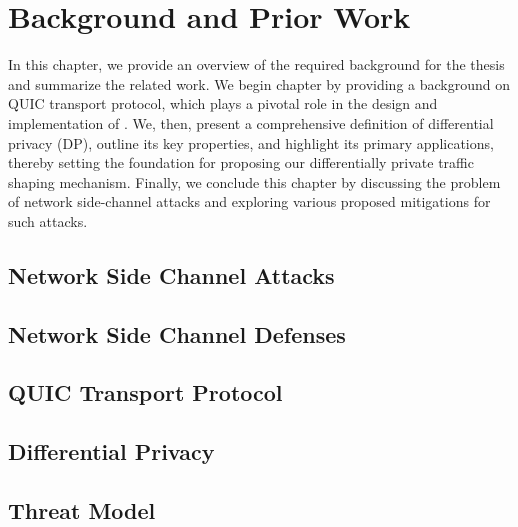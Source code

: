 \chapter{Background and Prior Work}\label{ch:background}




In this chapter, we provide an overview of the required background for the thesis and summarize the related work.
We begin chapter by providing a background on QUIC transport protocol, which plays a pivotal role in the design and implementation of {\sys}.
We, then, present a comprehensive definition of differential privacy (DP), outline its key properties, and highlight its primary applications, thereby setting the foundation for proposing our differentially private traffic shaping mechanism.
Finally, we conclude this chapter by discussing the problem of network side-channel attacks and exploring various proposed mitigations for such attacks. 

\section{Network Side Channel Attacks}\label{sec:ns-attacks}


\section{Network Side Channel Defenses}\label{sec:ns-defenses}


\section{QUIC Transport Protocol}


\section{Differential Privacy}\label{sec:dp-background}





\section{Threat Model}\label{sec:threat-model}





